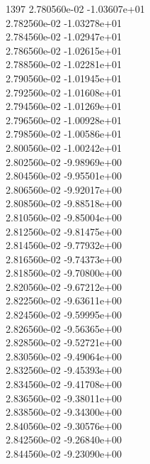 1397	2.780560e-02	-1.03607e+01	\\ 	2.782560e-02	-1.03278e+01	\\ 	2.784560e-02	-1.02947e+01	\\ 	2.786560e-02	-1.02615e+01	\\ 	2.788560e-02	-1.02281e+01	\\ 	2.790560e-02	-1.01945e+01	\\ 	2.792560e-02	-1.01608e+01	\\ 	2.794560e-02	-1.01269e+01	\\ 	2.796560e-02	-1.00928e+01	\\ 	2.798560e-02	-1.00586e+01	\\ 	2.800560e-02	-1.00242e+01	\\ 	2.802560e-02	-9.98969e+00	\\ 	2.804560e-02	-9.95501e+00	\\ 	2.806560e-02	-9.92017e+00	\\ 	2.808560e-02	-9.88518e+00	\\ 	2.810560e-02	-9.85004e+00	\\ 	2.812560e-02	-9.81475e+00	\\ 	2.814560e-02	-9.77932e+00	\\ 	2.816560e-02	-9.74373e+00	\\ 	2.818560e-02	-9.70800e+00	\\ 	2.820560e-02	-9.67212e+00	\\ 	2.822560e-02	-9.63611e+00	\\ 	2.824560e-02	-9.59995e+00	\\ 	2.826560e-02	-9.56365e+00	\\ 	2.828560e-02	-9.52721e+00	\\ 	2.830560e-02	-9.49064e+00	\\ 	2.832560e-02	-9.45393e+00	\\ 	2.834560e-02	-9.41708e+00	\\ 	2.836560e-02	-9.38011e+00	\\ 	2.838560e-02	-9.34300e+00	\\ 	2.840560e-02	-9.30576e+00	\\ 	2.842560e-02	-9.26840e+00	\\ 	2.844560e-02	-9.23090e+00	\\ \hline
